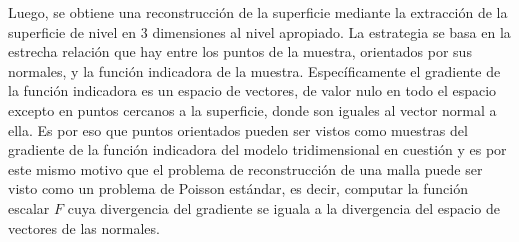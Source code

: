 Luego, se obtiene una reconstrucción de la superficie mediante la extracción de la superficie de nivel en 3 dimensiones al nivel apropiado.
La estrategia se basa en la estrecha relación que hay entre los puntos de la muestra, orientados por sus normales, y la función indicadora de la muestra. Específicamente el gradiente de la función indicadora es un espacio de vectores, de valor nulo en todo el espacio excepto en puntos cercanos a la superficie, donde son iguales al vector normal a ella.
Es por eso que puntos orientados pueden ser vistos como muestras del gradiente de la función indicadora del modelo tridimensional en cuestión y es por este mismo motivo que el problema de reconstrucción de una malla puede ser visto como un problema de Poisson estándar, es decir, computar la función escalar $F$ cuya divergencia del gradiente se iguala a la divergencia del espacio de vectores de las normales.
